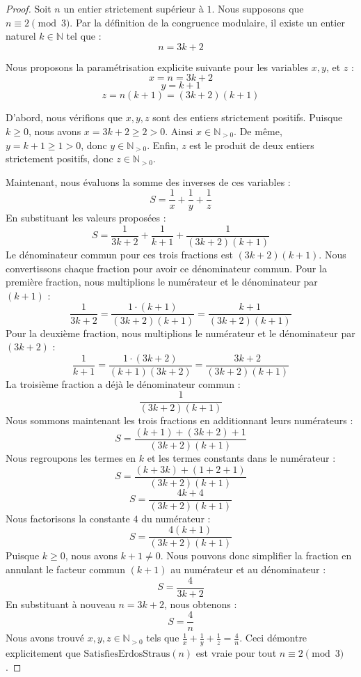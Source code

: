 \documentclass[12pt, a4paper]{article}
\begin{document}
\begin{proof}
Soit $n$ un entier strictement sup\'erieur \`a $1$. Nous supposons que $n \equiv 2 \pmod 3$.
Par la d\'efinition de la congruence modulaire, il existe un entier naturel $k \in \mathbb{N}$ tel que :
\[ n = 3k + 2 \]

Nous proposons la param\'etrisation explicite suivante pour les variables $x, y$, et $z$ :
\[ x = n = 3k + 2 \]
\[ y = k + 1 \]
\[ z = n(k + 1) = (3k + 2)(k + 1) \]

D'abord, nous v\'erifions que $x, y, z$ sont des entiers strictement positifs.
Puisque $k \ge 0$, nous avons $x = 3k + 2 \ge 2 > 0$. Ainsi $x \in \mathbb{N}_{>0}$.
De m\^eme, $y = k + 1 \ge 1 > 0$, donc $y \in \mathbb{N}_{>0}$.
Enfin, $z$ est le produit de deux entiers strictement positifs, donc $z \in \mathbb{N}_{>0}$.

Maintenant, nous \'evaluons la somme des inverses de ces variables :
\[ S = \frac{1}{x} + \frac{1}{y} + \frac{1}{z} \]
En substituant les valeurs propos\'ees :
\[ S = \frac{1}{3k + 2} + \frac{1}{k + 1} + \frac{1}{(3k + 2)(k + 1)} \]
Le d\'enominateur commun pour ces trois fractions est $(3k + 2)(k + 1)$.
Nous convertissons chaque fraction pour avoir ce d\'enominateur commun.
Pour la premi\`ere fraction, nous multiplions le num\'erateur et le d\'enominateur par $(k + 1)$ :
\[ \frac{1}{3k + 2} = \frac{1 \cdot (k + 1)}{(3k + 2)(k + 1)} = \frac{k + 1}{(3k + 2)(k + 1)} \]
Pour la deuxi\`eme fraction, nous multiplions le num\'erateur et le d\'enominateur par $(3k + 2)$ :
\[ \frac{1}{k + 1} = \frac{1 \cdot (3k + 2)}{(k + 1)(3k + 2)} = \frac{3k + 2}{(3k + 2)(k + 1)} \]
La troisi\`eme fraction a d\'ej\`a le d\'enominateur commun :
\[ \frac{1}{(3k + 2)(k + 1)} \]
Nous sommons maintenant les trois fractions en additionnant leurs num\'erateurs :
\[ S = \frac{(k + 1) + (3k + 2) + 1}{(3k + 2)(k + 1)} \]
Nous regroupons les termes en $k$ et les termes constants dans le num\'erateur :
\[ S = \frac{(k + 3k) + (1 + 2 + 1)}{(3k + 2)(k + 1)} \]
\[ S = \frac{4k + 4}{(3k + 2)(k + 1)} \]
Nous factorisons la constante $4$ du num\'erateur :
\[ S = \frac{4(k + 1)}{(3k + 2)(k + 1)} \]
Puisque $k \ge 0$, nous avons $k + 1 \neq 0$. Nous pouvons donc simplifier la fraction en annulant le facteur commun $(k + 1)$ au num\'erateur et au d\'enominateur :
\[ S = \frac{4}{3k + 2} \]
En substituant \`a nouveau $n = 3k + 2$, nous obtenons :
\[ S = \frac{4}{n} \]
Nous avons trouv\'e $x, y, z \in \mathbb{N}_{>0}$ tels que $\frac{1}{x} + \frac{1}{y} + \frac{1}{z} = \frac{4}{n}$.
Ceci d\'emontre explicitement que $\text{SatisfiesErdosStraus}(n)$ est vraie pour tout $n \equiv 2 \pmod 3$.
\end{proof}
\end{document}
